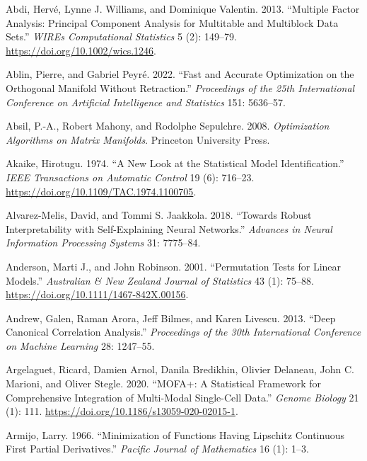 \documentclass[
  10pt,
  letterpaper,
]{report}
\newlength{\cslhangindent}
\newenvironment{CSLReferences}[2] %
 {\begin{list}{}{%
  \setlength{\itemindent}{0pt}
  \setlength{\leftmargin}{0pt}
  \setlength{\parsep}{0pt}
  \ifodd #1
   \setlength{\leftmargin}{\cslhangindent}
   \setlength{\itemindent}{-1\cslhangindent}
  \fi
  \setlength{\itemsep}{#2\baselineskip}}}
 {\end{list}}
\begin{document}
\protect{}\label{refs}
\begin{CSLReferences}{1}{1}
Abdi, Hervé, Lynne J. Williams, and Dominique Valentin. 2013.
{``Multiple Factor Analysis: Principal Component Analysis for Multitable
and Multiblock Data Sets.''} \emph{WIREs Computational Statistics} 5
(2): 149--79. \url{https://doi.org/10.1002/wics.1246}.

Ablin, Pierre, and Gabriel Peyré. 2022. {``Fast and Accurate
Optimization on the Orthogonal Manifold Without Retraction.''}
\emph{Proceedings of the 25th International Conference on Artificial
Intelligence and Statistics} 151: 5636--57.

Absil, P.-A., Robert Mahony, and Rodolphe Sepulchre. 2008.
\emph{Optimization Algorithms on Matrix Manifolds}. Princeton University
Press.

Akaike, Hirotugu. 1974. {``A New Look at the Statistical Model
Identification.''} \emph{IEEE Transactions on Automatic Control} 19 (6):
716--23. \url{https://doi.org/10.1109/TAC.1974.1100705}.

Alvarez-Melis, David, and Tommi S. Jaakkola. 2018. {``Towards Robust
Interpretability with Self-Explaining Neural Networks.''} \emph{Advances
in Neural Information Processing Systems} 31: 7775--84.

Anderson, Marti J., and John Robinson. 2001. {``Permutation Tests for
Linear Models.''} \emph{Australian \& New Zealand Journal of Statistics}
43 (1): 75--88. \url{https://doi.org/10.1111/1467-842X.00156}.

Andrew, Galen, Raman Arora, Jeff Bilmes, and Karen Livescu. 2013.
{``Deep Canonical Correlation Analysis.''} \emph{Proceedings of the 30th
International Conference on Machine Learning} 28: 1247--55.

Argelaguet, Ricard, Damien Arnol, Danila Bredikhin, Olivier Delaneau,
John C. Marioni, and Oliver Stegle. 2020. {``{MOFA+}: A Statistical
Framework for Comprehensive Integration of Multi-Modal Single-Cell
Data.''} \emph{Genome Biology} 21 (1): 111.
\url{https://doi.org/10.1186/s13059-020-02015-1}.

Armijo, Larry. 1966. {``Minimization of Functions Having {Lipschitz}
Continuous First Partial Derivatives.''} \emph{Pacific Journal of
Mathematics} 16 (1): 1--3.


\end{CSLReferences}
\end{document}
